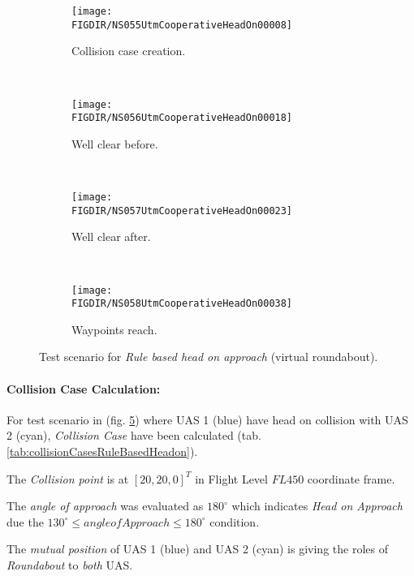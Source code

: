 \begin{figure}[H]
    \centering
    \begin{subfigure}{0.75\textwidth}
        \centering
        \texttt{[image: \\FIGDIR/NS055UtmCooperativeHeadOn00008]}
        \caption{Collision case creation.}
        \label{fig:ruleBasedHeadOnSituationCollisionCaseCreation}
    \end{subfigure}
    \\
    \begin{subfigure}{0.75\textwidth}
        \centering
        \texttt{[image: \\FIGDIR/NS056UtmCooperativeHeadOn00018]} 
        \caption{Well clear before.}
        \label{fig:ruleBasedHeadOnWellClearBefore}
    \end{subfigure}
    \\
    \begin{subfigure}{0.75\textwidth}
        \centering
        \texttt{[image: \\FIGDIR/NS057UtmCooperativeHeadOn00023]} 
        \caption{Well clear after.}
        \label{fig:ruleBasedHeadOnWellClearAfter}
    \end{subfigure}
    \\
    \begin{subfigure}{0.75\textwidth}
        \centering
        \texttt{[image: \\FIGDIR/NS058UtmCooperativeHeadOn00038]} 
        \caption{Waypoints reach.}
        \label{fig:ruleBasedHeadOnWaypointsReach}
    \end{subfigure}
    \caption{Test scenario for \emph{Rule based head on approach} (virtual roundabout). }
    \label{fig:testCaseRuleBasedHeadOnApproach}
\end{figure}

\paragraph{Collision Case Calculation: } For test scenario in (fig. \ref{fig:testCaseRuleBasedHeadOnApproach}) where UAS 1 (blue) have head on collision with UAS 2 (cyan), \emph{Collision Case} have been calculated (tab. \ref{tab:collisionCasesRuleBasedHeadon}).

The \emph{Collision point} is at $[20,20,0]^T$ in Flight Level $FL450$ coordinate frame.

The \emph{angle of approach} was evaluated as $180^{\circ}$ which indicates \emph{Head on Approach} due the $130^\circ \le angle of Approach \le 180^\circ$ condition.

The \emph{mutual position} of UAS 1 (blue) and UAS 2 (cyan) is giving the roles of \emph{Roundabout} to \emph{both} UAS.

